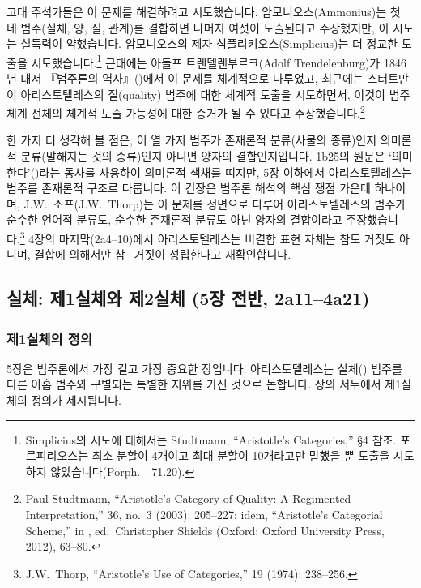 \documentclass[12pt, a4paper]{article}
\begin{document}
고대 주석가들은 이 문제를 해결하려고 시도했습니다. 암모니오스(Ammonius)는 첫 네 범주(실체, 양, 질, 관계)를 결합하면 나머지 여섯이 도출된다고 주장했지만, 이 시도는 설득력이 약했습니다. 암모니오스의 제자 심플리키오스(Simplicius)는 더 정교한 도출을 시도했습니다.\footnote{Simplicius의 시도에 대해서는 Studtmann, ``Aristotle's Categories,'' §4 참조. 포르피리오스는 최소 분할이 4개이고 최대 분할이 10개라고만 말했을 뿐 도출을 시도하지 않았습니다(Porph.\ \ 71.20).} 근대에는 아돌프 트렌델렌부르크(Adolf Trendelenburg)가 1846년 대저 『범주론의 역사』()에서 이 문제를 체계적으로 다루었고, 최근에는 스터트만이 아리스토텔레스의 질(quality) 범주에 대한 체계적 도출을 시도하면서, 이것이 범주 체계 전체의 체계적 도출 가능성에 대한 증거가 될 수 있다고 주장했습니다.\footnote{Paul Studtmann, ``Aristotle's Category of Quality: A Regimented Interpretation,''  36, no.\ 3 (2003): 205--227; idem, ``Aristotle's Categorial Scheme,'' in , ed.\ Christopher Shields (Oxford: Oxford University Press, 2012), 63--80.}

한 가지 더 생각해 볼 점은, 이 열 가지 범주가 존재론적 분류(사물의 종류)인지 의미론적 분류(말해지는 것의 종류)인지 아니면 양자의 결합인지입니다. 1b25의 원문은 `의미한다'()라는 동사를 사용하여 의미론적 색채를 띠지만, 5장 이하에서 아리스토텔레스는 범주를 존재론적 구조로 다룹니다. 이 긴장은 범주론 해석의 핵심 쟁점 가운데 하나이며, J.W.\ 소프(J.W.\ Thorp)는 이 문제를 정면으로 다루어 아리스토텔레스의 범주가 순수한 언어적 분류도, 순수한 존재론적 분류도 아닌 양자의 결합이라고 주장했습니다.\footnote{J.W.\ Thorp, ``Aristotle's Use of Categories,''  19 (1974): 238--256.} 4장의 마지막(2a4--10)에서 아리스토텔레스는 비결합 표현 자체는 참도 거짓도 아니며, 결합에 의해서만 참·거짓이 성립한다고 재확인합니다.

\subsection{실체: 제1실체와 제2실체 (5장 전반, 2a11--4a21)}

\subsubsection{제1실체의 정의}

5장은 범주론에서 가장 길고 가장 중요한 장입니다. 아리스토텔레스는 실체() 범주를 다른 아홉 범주와 구별되는 특별한 지위를 가진 것으로 논합니다. 장의 서두에서 제1실체의 정의가 제시됩니다.
\end{document}
